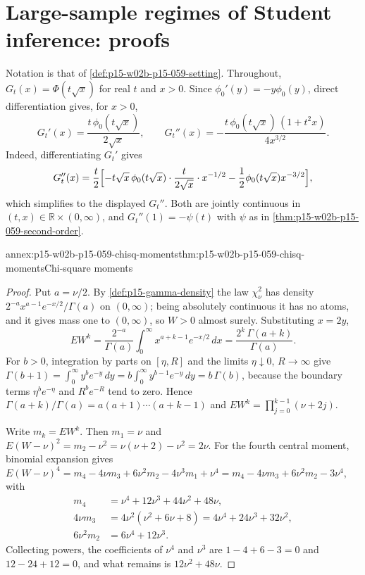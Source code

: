 \section{Large-sample regimes of Student inference: proofs}
\label{sec:annex-p15-w02b-p15-059}

Notation is that of \cref{def:p15-w02b-p15-059-setting}. Throughout,
\(G_t(x)=\Phi(t\sqrt x)\) for real \(t\) and \(x>0\). Since
\(\phi_0'(y)=-y\phi_0(y)\), direct differentiation gives, for \(x>0\),
\[
 G_t'(x)=\frac{t\,\phi_0(t\sqrt x)}{2\sqrt x},\qquad
 G_t''(x)=-\frac{t\,\phi_0(t\sqrt x)\,(1+t^2x)}{4x^{3/2}} .
\]
Indeed, differentiating \(G_t'\) gives
\[
 G_t''(x)=\frac t2\Bigl[-t\sqrt x\,\phi_0(t\sqrt x)\cdot\frac t{2\sqrt x}\cdot
 x^{-1/2}-\frac12\phi_0(t\sqrt x)x^{-3/2}\Bigr],
\]
which simplifies to the displayed \(G_t''\). Both are jointly continuous in \((t,x)\in\mathbb R\times(0,\infty)\),
and \(G_t''(1)=-\psi(t)\) with \(\psi\) as in
\cref{thm:p15-w02b-p15-059-second-order}.

\begin{annexitem}{annex:p15-w02b-p15-059-chisq-moments}{thm:p15-w02b-p15-059-chisq-moments}{Chi-square moments}
\begin{proof}
Put \(a=\nu/2\). By \cref{def:p15-gamma-density} the law \(\chi^2_\nu\) has
density \(2^{-a}x^{a-1}e^{-x/2}/\Gamma(a)\) on \((0,\infty)\); being
absolutely continuous it has no atoms, and it gives mass one to
\((0,\infty)\), so \(W>0\) almost surely. Substituting \(x=2y\),
\[
 EW^k=\frac{2^{-a}}{\Gamma(a)}\int_0^\infty x^{a+k-1}e^{-x/2}\,dx
     =\frac{2^k\,\Gamma(a+k)}{\Gamma(a)} .
\]
For \(b>0\), integration by parts on \([\eta,R]\) and the limits
\(\eta\downarrow0\), \(R\to\infty\) give
\(\Gamma(b+1)=\int_0^\infty y^be^{-y}\,dy=b\int_0^\infty y^{b-1}e^{-y}\,dy
=b\,\Gamma(b)\), because the boundary terms \(\eta^be^{-\eta}\) and
\(R^be^{-R}\) tend to zero. Hence
\(\Gamma(a+k)/\Gamma(a)=a(a+1)\cdots(a+k-1)\) and
\(EW^k=\prod_{j=0}^{k-1}(\nu+2j)\).

Write \(m_k=EW^k\). Then \(m_1=\nu\) and
\(E(W-\nu)^2=m_2-\nu^2=\nu(\nu+2)-\nu^2=2\nu\). For the fourth central
moment, binomial expansion gives
\(E(W-\nu)^4=m_4-4\nu m_3+6\nu^2m_2-4\nu^3m_1+\nu^4
=m_4-4\nu m_3+6\nu^2m_2-3\nu^4\), with
\[
\begin{aligned}
 m_4&=\nu^4+12\nu^3+44\nu^2+48\nu,\\
 4\nu m_3&=4\nu^2(\nu^2+6\nu+8)=4\nu^4+24\nu^3+32\nu^2,\\
 6\nu^2m_2&=6\nu^4+12\nu^3 .
\end{aligned}
\]
Collecting powers, the coefficients of \(\nu^4\) and \(\nu^3\) are
\(1-4+6-3=0\) and \(12-24+12=0\), and what remains is
\(12\nu^2+48\nu\).
\end{proof}
\end{annexitem}

